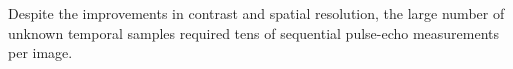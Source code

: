 Despite
the improvements in
contrast and
spatial resolution,
the large number of
unknown temporal samples required
tens of
sequential pulse-echo measurements per
image.
